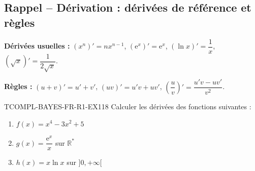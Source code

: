 

\subsection*{Rappel -- Dérivation : dérivées de référence et règles}

\textbf{Dérivées usuelles :} $(x^n)' = n x^{n-1}$, $(\mathrm{e}^x)' = \mathrm{e}^x$, $(\ln x)' = \dfrac{1}{x}$, $(\sqrt{x})' = \dfrac{1}{2\sqrt{x}}$.

\textbf{Règles :} $(u+v)' = u' + v'$, $(uv)' = u'v + uv'$, $\left(\dfrac{u}{v}\right)' = \dfrac{u'v - uv'}{v^2}$.

\begin{exercice}{TCOMPL-BAYES-FR-R1-EX1}{1}{8}
Calculer les dérivées des fonctions suivantes :
\begin{enumerate}
  \item $f(x) = x^4 - 3x^2 + 5$
  \item $g(x) = \dfrac{\mathrm{e}^x}{x}$ sur $\mathbb{R}^*$
  \item $h(x) = x \ln x$ sur $]0, +\infty[$
\end{enumerate}
\end{exercice}

